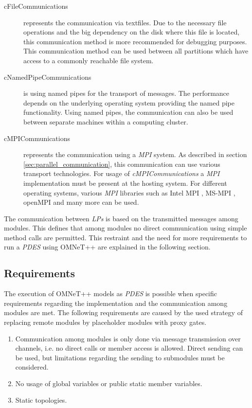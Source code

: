 \begin{description}
    \item[cFileCommunications] represents the communication via textfiles.
    Due to the necessary file operations and the big dependency on the disk where this file is located, this communication method is more recommended for debugging purposes.
    This communication method can be used between all partitions which have access to a commonly reachable file system.
    \item[cNamedPipeCommunications] is using named pipes for the transport of messages.
    The performance depends on the underlying operating system providing the named pipe functionality.
    Using named pipes, the communication can also be used between separate machines within a computing cluster.
    \item[cMPICommunications] represents the communication using a \emph{MPI} system.
    As described in section \ref{sec:parallel_communication}, this communication can use various transport technologies.
    For usage of \emph{cMPICommunications} a \emph{MPI} implementation must be present at the hosting system.
    For different operating systems, various \emph{MPI} libraries such as Intel MPI \cite{intelmpi_hp}, MS-MPI \cite{msmpi_hp}, openMPI \cite{openmpi_hp} and many more can be used.
\end{description}

The communication between \emph{LPs} is based on the transmitted messages among modules.
This defines that among modules no direct communication using simple method calls are permitted.
This restraint and the need for more requirements to run a \emph{PDES} using OMNeT++ are explained in the following section.

\subsection{Requirements}
\label{sec:parallel_omnet_requirements}
The execution of OMNeT++ models as \emph{PDES} is possible when specific requirements regarding the implementation and the communication among modules are met.
The following requirements are caused by the used strategy of replacing remote modules by placeholder modules with proxy gates. \cite[section III.B]{varga_parallel_2003}

\begin{enumerate}
    \item Communication among modules is only done via message transmission over channels, i.e. no direct calls or member access is allowed.
    Direct sending can be used, but limitations regarding the sending to submodules must be considered.
    \item No usage of global variables or public static member variables.
    \item Static topologies.
\end{enumerate}

